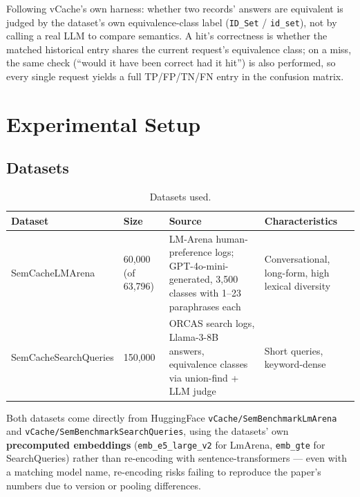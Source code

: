 \documentclass[11pt]{article}
\newenvironment{fittab}{\begin{lrbox}{\fittabbox}}{\end{lrbox}%
  \ifdim\wd\fittabbox>\linewidth\resizebox{\linewidth}{!}{\usebox{\fittabbox}}\else\usebox{\fittabbox}\fi}
\begin{document}
Following vCache's own harness: whether two records' answers are equivalent is judged by the dataset's own equivalence-class label (\texttt{ID\_\allowbreak{}Set} / \texttt{id\_\allowbreak{}set}), not by calling a real LLM to compare semantics. A hit's correctness is whether the matched historical entry shares the current request's equivalence class; on a miss, the same check (``would it have been correct had it hit'') is also performed, so every single request yields a full TP/FP/TN/FN entry in the confusion matrix.

\section{Experimental Setup}

\subsection{Datasets}
\label{sec:datasets}

\begin{table}[h]
\centering
\small
\begin{fittab}\begin{tabular}{@{}lp{2cm}p{5cm}p{4.2cm}@{}}
\toprule
\textbf{Dataset} & \textbf{Size} & \textbf{Source} & \textbf{Characteristics} \\
\midrule
SemCacheLMArena & 60{,}000 (of 63{,}796) & LM-Arena human-preference logs; GPT-4o-mini-generated, 3{,}500 classes with 1--23 paraphrases each & Conversational, long-form, high lexical diversity \\
\addlinespace
SemCacheSearchQueries & 150{,}000 & ORCAS search logs, Llama-3-8B answers, equivalence classes via union-find + LLM judge & Short queries, keyword-dense \\
\bottomrule
\end{tabular}\end{fittab}
\caption{Datasets used.}
\end{table}

Both datasets come directly from HuggingFace \texttt{v\allowbreak{}Cache/\allowbreak{}Sem\allowbreak{}Benchmark\allowbreak{}Lm\allowbreak{}Arena} and \texttt{v\allowbreak{}Cache/\allowbreak{}Sem\allowbreak{}Benchmark\allowbreak{}Search\allowbreak{}Queries}, using the datasets' own \textbf{precomputed embeddings} (\texttt{emb\_\allowbreak{}e5\_\allowbreak{}large\_\allowbreak{}v2} for LmArena, \texttt{emb\_\allowbreak{}gte} for SearchQueries) rather than re-encoding with sentence-transformers --- even with a matching model name, re-encoding risks failing to reproduce the paper's numbers due to version or pooling differences.
\end{document}
